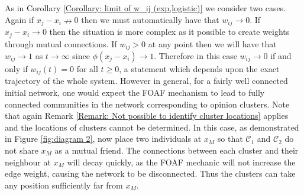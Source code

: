 \documentclass{article}
\begin{document}
As in Corollary \ref{Corollary: limit of w_ij (exp,logistic)} we consider two cases. Again if $x_j - x_i \nrightarrow 0$ then we must automatically have that $w_{ij}\rightarrow0$. If $x_j - x_i \rightarrow 0$ then the situation is more complex as it possible to create weights through mutual connections. If $w_{ij}>0$ at any point then we will have that $w_{ij}\rightarrow1$ as $t\rightarrow\infty$ since $\phi(x_j - x_i) \rightarrow 1$. Therefore in this case $w_{ij}\rightarrow0$ if and only if $w_{ij}(t)=0$ for all $t\geq0$, a statement which depends upon the exact trajectory of the whole system. However in general, for a fairly well connected initial network, one would expect the FOAF mechanism to lead to fully connected communities in the network corresponding to opinion clusters. Note that again Remark \ref{Remark: Not possible to identify cluster locations} applies and the locations of clusters cannot be determined. In this case, as demonstrated in Figure \ref{fig:diagram 2}, now place two individuals at $x_M$ so that $\mathcal{C}_1$ and $\mathcal{C}_2$ do not share $x_M$ as a mutual friend. The connections between each cluster and their neighbour at $x_M$ will decay quickly, as the FOAF mechanic will not increase the edge weight, causing the network to be disconnected. Thus the clusters can take any position sufficiently far from $x_M$. 
\end{document}
